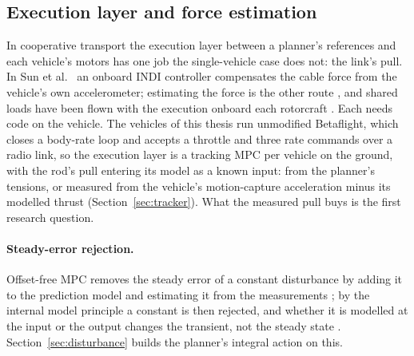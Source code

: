 
\subsection{Execution layer and force estimation}
\label{sec:lit_execution}

In cooperative transport the execution layer between a planner's references and each vehicle's motors has one job
the single-vehicle case does not: the link's pull. In Sun et al.\ \cite{tudelft} an onboard INDI controller
\cite{smeur2016indi} compensates the cable force from the vehicle's own accelerometer; estimating the force is the other
route \cite{klausen2020cooperative, tagliabue2019robust}, and shared loads have been flown with the execution onboard
each rotorcraft \cite{demarina2019flexible, bulka2022experiments}. Each needs code on the vehicle. The vehicles of this
thesis run unmodified Betaflight, which closes a body-rate loop and accepts a throttle and three rate commands over a
radio link, so the execution layer is a tracking MPC per vehicle on the ground, with the rod's pull entering its model
as a known input: from the planner's tensions, or measured from the vehicle's motion-capture acceleration minus its
modelled thrust (Section~\ref{sec:tracker}). What the measured pull buys is the first research question.

\paragraph{Steady-error rejection.} Offset-free MPC removes the steady error of a constant disturbance by adding it to
the prediction model and estimating it from the measurements \cite{muske2002disturbance, pannocchia2003disturbance,
maeder2009linear}; by the internal model principle \cite{francis1976internal} a constant is then rejected, and whether
it is modelled at the input or the output changes the transient, not the steady state \cite{pannocchia2007combined}.
Section~\ref{sec:disturbance} builds the planner's integral action on this.

